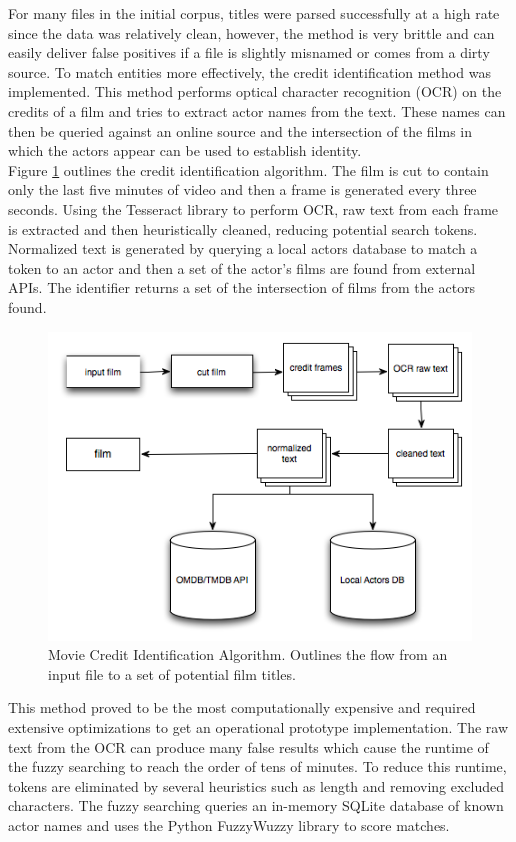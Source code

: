\documentclass[paper=a4, fontsize=11pt]{scrartcl} %
\numberwithin{equation}{section} %
\numberwithin{figure}{section} %
\numberwithin{table}{section} %
\begin{document}
For many files in the initial corpus, titles were parsed successfully at a high rate since the data was relatively clean, however, the method is very brittle and can easily deliver false positives if a file is slightly misnamed or comes from a dirty source. To match entities more effectively, the credit identification method was implemented. This method performs optical character recognition (OCR) on the credits of a film and tries to extract actor names from the text. These names can then be queried against an online source and the intersection of the films in which the actors appear can be used to establish identity. \\

Figure \ref{fig:credit-identifier} outlines the credit identification algorithm. The film is cut to contain only the last five minutes of video and then a frame is generated every three seconds. Using the Tesseract library to perform OCR, raw text from each frame is extracted and then heuristically cleaned, reducing potential search tokens. Normalized text is generated by querying a local actors database to match a token to an actor and then a set of the actor's films are found from external APIs. The identifier returns a set of the intersection of films from the actors found. \\


\begin{figure}[H]
\center\includegraphics[scale=0.80]{credit-identifier.png}
\caption{Movie Credit Identification Algorithm. Outlines the flow from an input file to a set of potential film titles.}
\label{fig:credit-identifier}
\end{figure}


This method proved to be the most computationally expensive and required extensive optimizations to get an operational prototype implementation. The raw text from the OCR can produce many false results which cause the runtime of the fuzzy searching to reach the order of tens of minutes. To reduce this runtime, tokens are eliminated by several heuristics such as length and removing excluded characters. The fuzzy searching queries an in-memory SQLite database of known actor names and uses the Python FuzzyWuzzy library to score matches. \\
\end{document}
